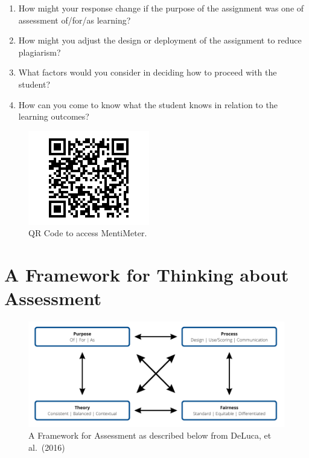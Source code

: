\documentclass[
]{book}
\providecommand{\tightlist}{%
  \setlength{\itemsep}{0pt}\setlength{\parskip}{0pt}}
\begin{document}
\begin{enumerate}
\def\labelenumi{\arabic{enumi}.}
\tightlist
\item
  How might your response change if the purpose of the assignment was one of assessment of/for/as learning?
\item
  How might you adjust the design or deployment of the assignment to reduce plagiarism?
\item
  What factors would you consider in deciding how to proceed with the student?
\item
  How can you come to know what the student knows in relation to the learning outcomes?
\end{enumerate}

\begin{figure}
\centering
\includegraphics{assets/twu-asmt/scenario5.png}
\caption{QR Code to access MentiMeter.}
\end{figure}

\hypertarget{a-framework-for-thinking-about-assessment}{%
\section{A Framework for Thinking about Assessment}\label{a-framework-for-thinking-about-assessment}}

\begin{figure}
\centering
\includegraphics{assets/twu-asmt/approaches-2-assessment.png}
\caption{A Framework for Assessment as described below from DeLuca, et al.~(2016)}
\end{figure}
\end{document}
